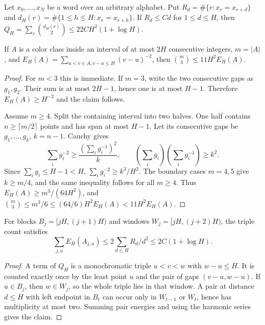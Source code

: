 
\begin{theorem}\label{thm:abstract-h2logh}
Let $x_0,\ldots,x_N$ be a word over an arbitrary alphabet. Put
$R_d=\#\{r:x_r=x_{r+d}\}$ and
$d_H(r)=\#\{1\leq h\leq H:x_r=x_{r+h}\}$. If $R_d\leq Cd$ for
$1\leq d\leq H$, then
$Q_H=\sum_r\binom{d_H(r)}2\leq22CH^2(1+\log H)$.
\end{theorem}

\begin{lemma}\label{lem:clique-energy}
If $A$ is a color class inside an interval of at most $2H$ consecutive
integers, $m=|A|$, and
$E_H(A)=\sum_{u<v\in A,v-u\leq H}(v-u)^{-2}$, then
$\binom m3\leq11H^2E_H(A)$.
\end{lemma}

\begin{proof}
For $m<3$ this is immediate. If $m=3$, write the two consecutive gaps as
$g_1,g_2$. Their sum is at most $2H-1$, hence one is at most $H-1$.
Therefore $E_H(A)\geq H^{-2}$ and the claim follows.

Assume $m\geq4$. Split the containing interval into two halves. One half
contains $n\geq\lceil m/2\rceil$ points and has span at most $H-1$.
Let its consecutive gaps be $g_1,\ldots,g_k$, $k=n-1$. Cauchy gives
\[
\sum_i g_i^{-2}\geq \frac{(\sum_i g_i^{-1})^2}{k},\qquad
(\sum_i g_i)(\sum_i g_i^{-1})\geq k^2.
\]
Since $\sum_i g_i\leq H-1<H$,
$\sum_i g_i^{-2}\geq k^3/H^2$. The boundary cases $m=4,5$ give
$k\geq m/4$, and the same inequality follows for all $m\geq4$.
Thus $E_H(A)\geq m^3/(64H^2)$, and
$\binom m3\leq m^3/6\leq(64/6)H^2E_H(A)<11H^2E_H(A)$.
\end{proof}

\begin{lemma}\label{lem:window-localize}
For blocks $B_j=[jH,(j+1)H)$ and windows $W_j=[jH,(j+2)H)$, the triple
count satisfies
\[
\sum_{j,a}E_H(A_{j,a})\leq2\sum_{d\leq H}R_d/d^2\leq2C(1+\log H).
\]
\end{lemma}

\begin{proof}
A term of $Q_H$ is a monochromatic triple $u<v<w$ with $w-u\leq H$.
It is counted exactly once by the least point $u$ and the pair of gaps
$(v-u,w-u)$. If $u\in B_j$, then $w\in W_j$, so the whole triple lies in
that window. A pair at distance $d\leq H$ with left endpoint in $B_t$ can
occur only in $W_{t-1}$ or $W_t$, hence has multiplicity at most two.
Summing pair energies and using the harmonic series gives the claim.
\end{proof}

